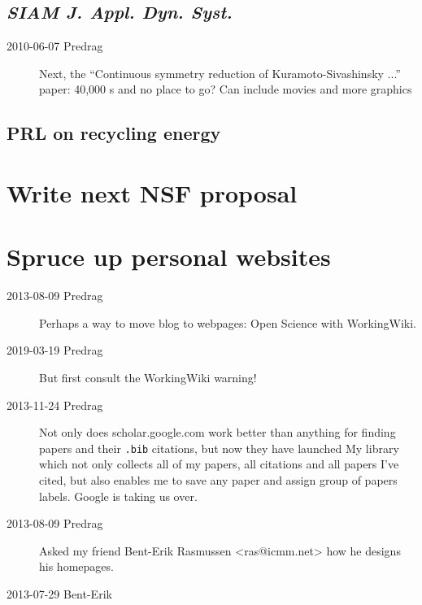 \subsection{\emph{SIAM J. Appl. Dyn. Syst.}}

\begin{description}

\item[2010-06-07 Predrag] Next, the
``Continuous symmetry reduction of Kuramoto-Sivashinsky ...'' paper:
40,000 \rpo s and no place to go?
Can include movies and more graphics

\end{description}

\subsection{PRL on recycling energy}

\section{Write next NSF proposal }

\section{Spruce up personal websites}

\begin{description}

\item[2013-08-09 Predrag] Perhaps a way to move  blog to
webpages: Open Science with
 {WorkingWiki}.

\item[2019-03-19 Predrag] But first consult the WorkingWiki
 {warning!}

\item[2013-11-24 Predrag]
Not only does
{scholar.google.com} work better than anything
for finding papers and their \texttt{.bib} citations, but now they
have launched
{My library} which not only collects all of
{my papers}, all citations
and all papers I've cited, but also enables me to save any paper and
assign group of papers labels. Google is taking us over.

\item[2013-08-09 Predrag] Asked my friend Bent-Erik Rasmussen
<ras@icmm.net> how he designs his homepages.

\item[2013-07-29 Bent-Erik]

\end{description}

